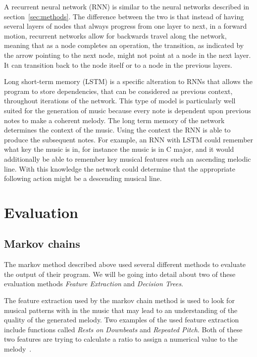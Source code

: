 \documentclass{sig-alternate}
\begin{document}
	 A recurrent neural network (RNN) is similar to the neural networks described in section~\ref{sec:methods}. The difference between the two is that instead of having several layers of nodes that always progress from one layer to next, in a forward motion, recurrent networks allow for backwards travel along the network, meaning that as a node completes an operation, the transition, as indicated by the arrow pointing to the next node, might not point at a node in the next layer. It can transition back to the node itself or to a node in the previous layers.
	
	Long short-term memory (LSTM) is a specific alteration to RNNs that allows the program to store dependencies, that can be considered as previous context, throughout iterations of the network. This type of model is particularly well suited for the generation of music because every note is dependent upon previous notes to make a coherent melody. The long term memory of the network determines the context of the music. Using the context the RNN is able to produce the subsequent notes. For example, an RNN with LSTM could remember what key the music is in, for instance the music is in C major, and it would additionally be able to remember key musical features such an ascending melodic line. With this knowledge the network could determine that the appropriate following action might be a descending musical line.


\section{Evaluation}
\label{sec:evaluation}

\subsection{Markov chains}
\label{sec:markovtraining}

	The markov method described above used several different methods to evaluate the output of their program. We will be going into detail about two of these evaluation methods \textit{Feature Extraction} and \textit{Decision Trees}. 

	The feature extraction used by the markov chain method is used to look for musical patterns with in the music that may lead to an understanding of the quality of the generated melody. Two examples of the used feature extraction include functions called \textit{Rests on Downbeats} and \textit{Repeated Pitch}. Both of these two features are trying to calculate a ratio to assign a numerical value to the melody~\cite{cit:Klinger}.
\end{document}
